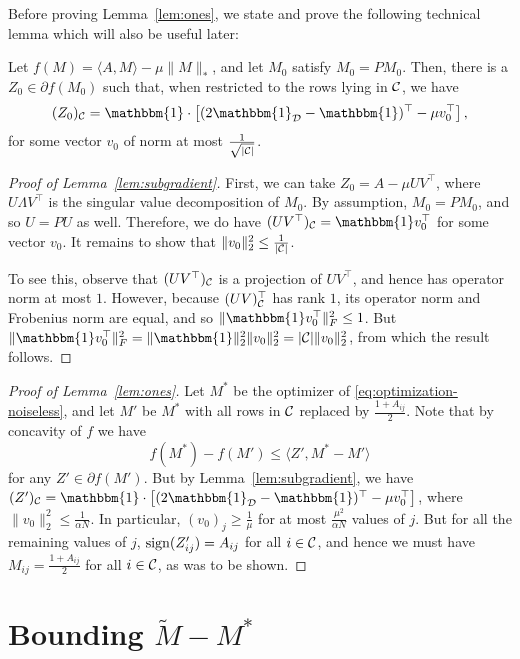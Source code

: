 \documentclass[11pt]{article}
\newcommand{\M}{\tilde{M}}
\newcommand{\sD}{\mathcal{D}}
\newcommand{\bi}{\mathbbm{1}}
\begin{document}
Before proving Lemma~\ref{lem:ones}, we state and prove the 
following technical lemma which will also be useful later:
\begin{lemma}
\label{lem:subgradient}
Let $f(M) = \langle A, M \rangle - \mu \|M\|_*$, and let 
$M_0$ satisfy $M_0 = PM_0$. Then,
there is a $Z_0 \in \partial f(M_0)$ such that, when restricted 
to the rows lying in $\mathcal{C}$, we have
\[ (Z_0)_{\sC} = \bi \cdot \left[(2\bi_{\sD}-\bi)^{\top} - \mu v_0^{\top}\right], \]
for some vector $v_0$ of norm at most $\frac{1}{\sqrt{|\mathcal{C}|}}$.
\end{lemma}
\begin{proof}[Proof of Lemma~\ref{lem:subgradient}]
First, we can take $Z_0 = A - \mu UV^{\top}$, where $U \Lambda V^{\top}$ is the singular 
value decomposition of $M_0$. By assumption, $M_0 = PM_0$, and so $U = PU$ as well. Therefore, 
we do have $(UV^{\top})_{\sC} = \bi v_0^{\top}$ for some vector $v_0$. It remains to show that 
$\|v_0\|_2^2 \leq \frac{1}{|\mathcal{C}|}$.

To see this, observe that $(UV^{\top})_{\mathcal{C}}$ is a projection of $UV^{\top}$, and hence 
has operator norm at most $1$. However, because $(UV)^{\top}_{\mathcal{C}}$ has rank $1$, its 
operator norm and Frobenius norm are equal, and so $\|\bi v_0^{\top}\|_F^2 \leq 1$. 
But $\|\bi v_0^{\top}\|_F^2 = \|\bi\|_2^2\|v_0\|_2^2 = |\sC|\|v_0\|_2^2$, from which 
the result follows.
\end{proof}

\begin{proof}[Proof of Lemma~\ref{lem:ones}]
Let $M^*$ be the optimizer of \eqref{eq:optimization-noiseless}, and 
let $M'$ be $M^*$ with all rows in $\mathcal{C}$ replaced by $\frac{1+A_{ij}}{2}$.
Note that by concavity of $f$ we have
\[ f(M^*) - f(M') \leq \langle Z', M^* - M' \rangle \]
for any $Z' \in \partial f(M')$. But by Lemma~\ref{lem:subgradient}, we 
have $(Z')_{\sC} = \bi \cdot \left[(2\bi_{\sD}-\bi)^{\top} - \mu v_0^{\top}\right]$, 
where $\|v_0\|_2^2 \leq \frac{1}{\alpha N}$. In particular, $(v_0)_j \geq \frac{1}{\mu}$ 
for at most $\frac{\mu^2}{\alpha N}$ values of $j$. But for all the remaining values of $j$, 
$\operatorname{sign}(Z'_{ij}) = A_{ij}$ for all $i \in \mathcal{C}$, and hence we must have $M_{ij} = \frac{1 + A_{ij}}{2}$ 
for all $i \in \mathcal{C}$, as was to be shown.
\end{proof}

\section{Bounding $\M - M^*$}
\end{document}
